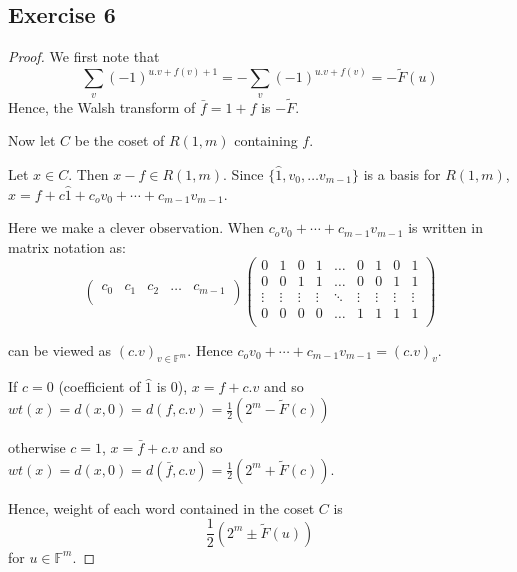 \documentclass[12pt]{article}
\begin{document}
\subsection*{Exercise 6}
\begin{proof}
We first note that $$\sum_v (-1)^{u.v + f(v) + 1} = - \sum_v (-1)^{u.v + f(v)} = -\tilde{F}(u)$$
Hence, the Walsh transform of $\bar{f} = 1+f$ is $- \tilde{F}$.

Now let $C$ be the coset of $R(1,m)$ containing $f$. 

Let $x \in C$. Then $x-f \in R(1,m)$. Since $\{\hat{1}, v_0, \ldots v_{m-1}\}$ is a basis for $R(1,m)$, $x = f + c\hat{1} + c_ov_0 + \cdots + c_{m-1}v_{m-1}$. 

Here we make a clever observation. When $c_ov_0 + \cdots + c_{m-1}v_{m-1}$ is written in matrix notation as: 
$$\begin{pmatrix}
c_0 & c_1 & c_2 & \ldots & c_{m-1} \\
\end{pmatrix} \begin{pmatrix}
0 & 1 & 0 & 1 & \ldots & 0 & 1 & 0 & 1 \\
0 & 0 & 1 & 1 & \ldots & 0 & 0 & 1 & 1 \\
\vdots & \vdots & \vdots & \vdots & \ddots & \vdots & \vdots & \vdots & \vdots \\
0 & 0 & 0 & 0 & \ldots & 1 & 1 & 1 & 1 \\
\end{pmatrix}$$

can be viewed as $(c.v)_{v \in \mathbb{F}^m}$. Hence $c_ov_0 + \cdots + c_{m-1}v_{m-1} = (c.v)_v$.

If $c=0$ (coefficient of $\hat{1}$ is $0$), $x = f + c.v$ and so $wt(x) = d(x, 0) = d(f, c.v) = \frac{1}{2}(2^m - \tilde{F}(c))$

otherwise $c=1$, $x = \bar{f} + c.v$ and so $wt(x) = d(x, 0) = d(\bar{f}, c.v) = \frac{1}{2}(2^m + \tilde{F}(c))$.

Hence, weight of each word contained in the coset $C$ is $$\frac{1}{2}(2^m \pm \tilde{F}(u))$$
for $u \in \mathbb{F}^m$.
\end{proof}
\end{document}
